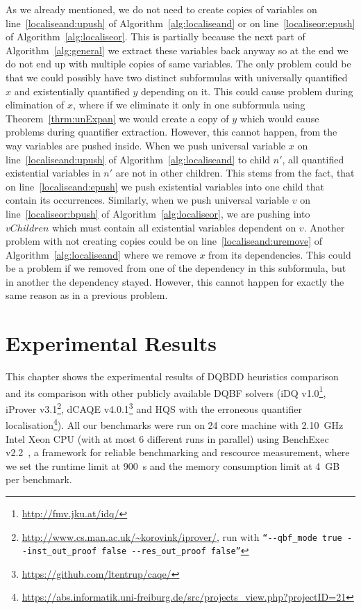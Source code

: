 \documentclass[
  digital, %
  color,
  twoside, %
  table,   %
  nolof,     %
  nolot,     %
]{fithesis3}
\theoremstyle{definition}
\theoremstyle{remark}
\begin{document}
As we already mentioned, we do not need to create copies of variables on line~\ref{localiseand:upush} of Algorithm~\ref{alg:localiseand} or on line~\ref{localiseor:epush} of Algorithm~\ref{alg:localiseor}. This is partially because the next part of Algorithm~\ref{alg:general} we extract these variables back anyway so at the end we do not end up with multiple copies of same variables. The only problem could be that we could possibly have two distinct subformulas with universally quantified $x$ and existentially quantified $y$ depending on it. This could cause problem during elimination of $x$, where if we eliminate it only in one subformula using Theorem~\ref{thrm:unExpan} we would create a copy of $y$ which would cause problems during quantifier extraction. However, this cannot happen, from the way variables are pushed inside. When we push universal variable $x$ on line~\ref{localiseand:upush} of Algorithm~\ref{alg:localiseand} to child $n'$, all quantified existential variables in $n'$ are not in other children. This stems from the fact, that on line~\ref{localiseand:epush} we push existential variables into one child that contain its occurrences. Similarly, when we push universal variable $v$ on line~\ref{localiseor:bpush} of Algorithm~\ref{alg:localiseor}, we are pushing into $vChildren$ which must contain all existential variables dependent on $v$. Another problem with not creating copies could be on line~\ref{localiseand:uremove} of Algorithm~\ref{alg:localiseand} where we remove $x$ from its dependencies. This could be a problem if we removed from one of the dependency in this subformula, but in another the dependency stayed. However, this cannot happen for exactly the same reason as in a previous problem.


\chapter{Experimental Results}
\label{chap:experiments}
This chapter shows the experimental results of DQBDD heuristics comparison and its comparison with other publicly available DQBF solvers 
(iDQ v1.0\footnote{\url{http://fmv.jku.at/idq/}},
iProver v3.1\footnote{\url{http://www.cs.man.ac.uk/~korovink/iprover/}, run with \texttt{``-{}-qbf\_mode true -{}-inst\_out\_proof false -{}-res\_out\_proof false''}},
dCAQE v4.0.1\footnote{\url{https://github.com/ltentrup/caqe/}}
and HQS with the erroneous quantifier localisation\footnote{\url{https://abs.informatik.uni-freiburg.de/src/projects_view.php?projectID=21}}). All our benchmarks were run on 24 core machine with \SI{2.10}{GHz} Intel Xeon CPU (with at most 6 different runs in parallel) using BenchExec v2.2~\cite{benchexec}, a framework for reliable benchmarking and rescource measurement, where we set the runtime limit at \SI{900}{s} and the memory consumption limit at \SI{4}{GB} per benchmark.
\end{document}
